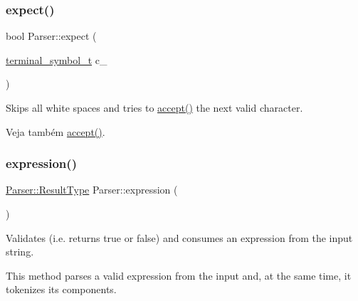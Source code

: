 \subsubsection{\texorpdfstring{expect()}{expect()}}
{\footnotesize\ttfamily bool Parser\+::expect (\begin{DoxyParamCaption}\item[{\hyperlink{classParser_a7d49b050a3c0df9e37ff81c5099be049}{terminal\+\_\+symbol\+\_\+t}}]{c\+\_\+ }\end{DoxyParamCaption})\hspace{0.3cm}{\ttfamily [private]}}



Skips all white spaces and tries to \hyperlink{classParser_a884775e075317b4b2cfb2016d3654f2a}{accept()} the next valid character. 

\begin{DoxySeeAlso}{Veja também}
\hyperlink{classParser_a884775e075317b4b2cfb2016d3654f2a}{accept()}. 
\end{DoxySeeAlso}
\mbox{\label{classParser_ab39d3a821509bfe5fdb2d9d481ae92e6}} 
\subsubsection{\texorpdfstring{expression()}{expression()}}
{\footnotesize\ttfamily \hyperlink{structParser_1_1ResultType}{Parser\+::\+Result\+Type} Parser\+::expression (\begin{DoxyParamCaption}{ }\end{DoxyParamCaption})\hspace{0.3cm}{\ttfamily [private]}}



Validates (i.\+e. returns true or false) and consumes an expression from the input string. 

This method parses a valid expression from the input and, at the same time, it tokenizes its components.

